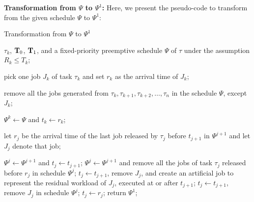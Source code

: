 {\bf Transformation from $\Psi$ to $\Psi^1$:}
Here, we present the pseudo-code to transform from the given schedule $\Psi$
to $\Psi^1$:
\begin{algorithm}[h]
  \caption{Transformation from $\Psi$ to $\Psi^1$}
     \begin{algorithmic}[1]\footnotesize
       \INPUT $\tau_k$, ${\bf T}_0$, ${\bf T}_1$, and a
       fixed-priority preemptive schedule $\Psi$ of $\tau$ under the
       assumption $R_k \leq T_k$;

       \STATE pick one job $J_k$ of task $\tau_k$ and set $r_k$ as
       the arrival time of $J_k$;

    \STATE remove all the jobs generated from $\tau_k, \tau_{k+1}, \tau_{k+2}, \ldots,
    \tau_n$ in the schedule $\Psi$, except $J_k$;

    \STATE $\Psi^k \leftarrow \Psi$ and $t_k \leftarrow r_k$; 

    
    \STATE let $r_j$ be the arrival time of the last
    job released by $\tau_j$ before $t_{j+1}$ in $\Psi^{j+1}$ and let
    $J_{j}$ denote that job;

    \STATE $\Psi^j \leftarrow \Psi^{j+1}$ and $t_j \leftarrow
    t_{j+1}$;  
    \ELSE
    \STATE $\Psi^j \leftarrow \Psi^{j+1}$ and remove all the jobs of task $\tau_j$ released before $r_j$
    in schedule $\Psi^j$;
     \STATE  $t_j \leftarrow t_{j+1}$, remove $J_j$, and  create an
     artificial job to represent the residual workload of $J_j$,
     executed at or after $t_{j+1}$; 
     \ELSE
     \STATE  $t_j \leftarrow t_{j+1}$, remove $J_j$ in schedule $\Psi^j$; 
     \ELSE
     \STATE  $t_j \leftarrow r_j$; 
     \ENDIF   
    \ENDIF
    \ENDIF
    \ENDFOR
    \STATE return $\Psi^1$;
  \end{algorithmic}
\end{algorithm}

